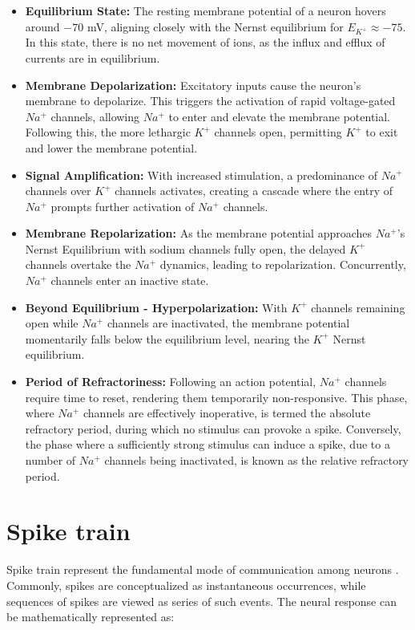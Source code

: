 \documentclass[12pt,a4paper]{report}
\begin{document}
\begin{itemize}
    \item \textbf{Equilibrium State:} The resting membrane potential of a neuron hovers around \(-70\) mV, aligning closely with the Nernst equilibrium for \( E_{K^+} \approx -75 \). In this state, there is no net movement of ions, as the influx and efflux of currents are in equilibrium.
    \item \textbf{Membrane Depolarization:} Excitatory inputs cause the neuron's membrane to depolarize. This triggers the activation of rapid voltage-gated \( Na^+ \) channels, allowing \( Na^+ \) to enter and elevate the membrane potential. Following this, the more lethargic \( K^+ \) channels open, permitting \( K^+ \) to exit and lower the membrane potential.
    \item \textbf{Signal Amplification:} With increased stimulation, a predominance of \( Na^+ \) channels over \( K^+ \) channels activates, creating a cascade where the entry of \( Na^+ \) prompts further activation of \( Na^+ \) channels.
    \item \textbf{Membrane Repolarization:} As the membrane potential approaches \( Na^+ \)'s Nernst Equilibrium with sodium channels fully open, the delayed \( K^+ \) channels overtake the \( Na^+ \) dynamics, leading to repolarization. Concurrently, \( Na^+ \) channels enter an inactive state.
    \item \textbf{Beyond Equilibrium - Hyperpolarization:} With \( K^+ \) channels remaining open while \( Na^+ \) channels are inactivated, the membrane potential momentarily falls below the equilibrium level, nearing the \( K^+ \) Nernst equilibrium.
    \item \textbf{Period of Refractoriness:} Following an action potential, \( Na^+ \) channels require time to reset, rendering them temporarily non-responsive. This phase, where \( Na^+ \) channels are effectively inoperative, is termed the absolute refractory period, during which no stimulus can provoke a spike. Conversely, the phase where a sufficiently strong stimulus can induce a spike, due to a number of \( Na^+ \) channels being inactivated, is known as the relative refractory period.
\end{itemize}


\section{Spike train}

Spike train represent the fundamental mode of communication among neurons \cite{SpikeTrains}. Commonly, spikes are conceptualized as instantaneous occurrences, while sequences of spikes are viewed as series of such events. The neural response can be mathematically represented as:
\end{document}
